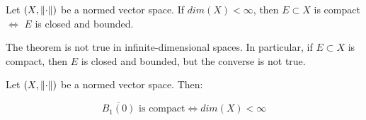 \begin{ftheorem}
    Let $(X, \left\|\cdot\right\|)$ be a normed vector space. If 
    $dim(X) < \infty$, then $E \subset X$ is compact $\iff$ $E$ is closed and bounded.
\end{ftheorem}

\begin{fremark}
    The theorem is not true in infinite-dimensional spaces. In particular,
    if $E \subset X$ is compact, then $E$ is closed and bounded, but the converse
    is not true.
\end{fremark}

\vspace{1em}

\begin{ftheorem}[Riesz]
    Let $(X, \left\|\cdot\right\|)$ be a normed vector space. Then:

    $$\overline{B_1(0)} \text{ is compact} \iff dim(X) < \infty$$
\end{ftheorem}

